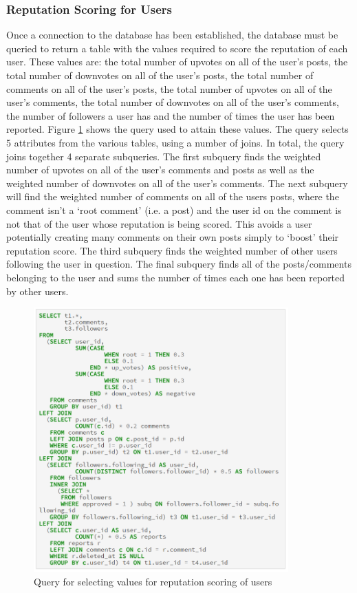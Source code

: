 \subsubsection{Reputation Scoring for Users}
Once a connection to the database has been established, the database must be queried to return a table with the values required to score the reputation of each user. These values are: the total number of upvotes on all of the user's posts, the total number of downvotes on all of the user's posts, the total number of comments on all of the user's posts, the total number of upvotes on all of the user's comments, the total number of downvotes on all of the user's comments, the number of followers a user has and the number of times the user has been reported. Figure \ref{fig:UserRepQuery} shows the query used to attain these values. The query selects 5 attributes from the various tables, using a number of joins. In total, the query joins together 4 separate subqueries. The first subquery finds the weighted number of upvotes on all of the user's comments and posts as well as the weighted number of downvotes on all of the user's comments. The next subquery will find the weighted number of comments on all of the users posts, where the comment isn't a `root comment' (i.e. a post) and the user id on the comment is not that of the user whose reputation is being scored. This avoids a user potentially creating many comments on their own posts simply to `boost' their reputation score. The third subquery finds the weighted number of other users following the user in question. The final subquery finds all of the posts/comments belonging to the user and sums the number of times each one has been reported by other users.

\begin{figure}[H]
\centering
\includegraphics[height=4in]{Images/Implementation/UserRepQuery}
\caption{Query for selecting values for reputation scoring of users}
\label{fig:UserRepQuery}
\end{figure}

